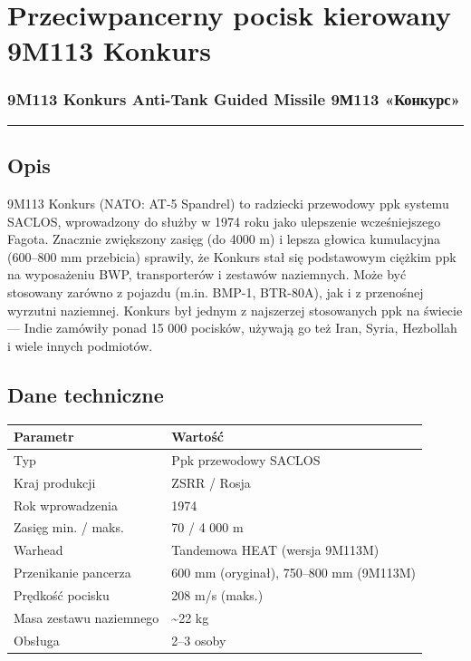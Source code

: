 \documentclass[12pt,oneside]{book}
\begin{document}
\section{Przeciwpancerny pocisk kierowany 9M113
Konkurs}\label{przeciwpancerny-pocisk-kierowany-9m113-konkurs}

\subsubsection{9M113 Konkurs Anti-Tank Guided Missile \textbar{} 9М113
«Конкурс»}\label{m113-konkurs-anti-tank-guided-missile-9ux43c113-ux43aux43eux43dux43aux443ux440ux441}

\begin{center}\rule{0.5\linewidth}{0.5pt}\end{center}

\subsection{Opis}\label{opis-50}

9M113 Konkurs (NATO: AT-5 Spandrel) to radziecki przewodowy ppk systemu
SACLOS, wprowadzony do służby w 1974 roku jako ulepszenie wcześniejszego
Fagota. Znacznie zwiększony zasięg (do 4000 m) i lepsza głowica
kumulacyjna (600--800 mm przebicia) sprawiły, że Konkurs stał się
podstawowym ciężkim ppk na wyposażeniu BWP, transporterów i zestawów
naziemnych. Może być stosowany zarówno z pojazdu (m.in. BMP-1, BTR-80A),
jak i z przenośnej wyrzutni naziemnej. Konkurs był jednym z najszerzej
stosowanych ppk na świecie --- Indie zamówiły ponad 15 000 pocisków,
używają go też Iran, Syria, Hezbollah i wiele innych podmiotów.

\subsection{Dane techniczne}\label{dane-techniczne-50}

\begin{longtable}[]{@{}ll@{}}
\toprule\noalign{}
Parametr & Wartość \\
\midrule\noalign{}
\endhead
\bottomrule\noalign{}
\endlastfoot
Typ & Ppk przewodowy SACLOS \\
Kraj produkcji & ZSRR / Rosja \\
Rok wprowadzenia & 1974 \\
Zasięg min. / maks. & 70 / 4 000 m \\
Warhead & Tandemowa HEAT (wersja 9M113M) \\
Przenikanie pancerza & 600 mm (oryginał), 750--800 mm (9M113M) \\
Prędkość pocisku & 208 m/s (maks.) \\
Masa zestawu naziemnego & \textasciitilde22 kg \\
Obsługa & 2--3 osoby \\
\end{longtable}
\end{document}
